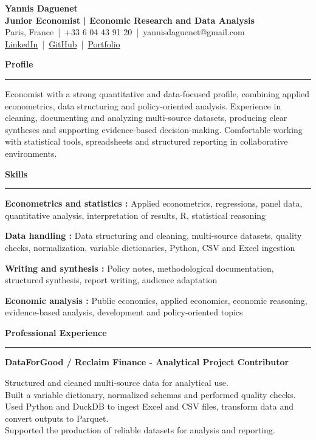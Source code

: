 \documentclass[11pt,a4paper]{article}
\newcommand{\sectiontitle}[1]{\vspace{0.26cm}\textbf{\large #1}\vspace{0.10cm}\hrule\vspace{0.13cm}}
\begin{document}
\begin{center}
{\Large \textbf{Yannis Daguenet} }\\
\textbf{Junior Economist | Economic Research and Data Analysis}\\
Paris, France \,|\, +33 6 04 43 91 20 \,|\, yannisdaguenet@gmail.com \\
\href{https://linkedin.com/in/yannis-daguenet}{LinkedIn} \,|\, \href{https://github.com/DaguenetYannis}{GitHub} \,|\, \href{https://daguenetyannisportfolio.netlify.app/}{Portfolio}\end{center}

\sectiontitle{Profile}

Economist with a strong quantitative and data-focused profile, combining applied econometrics, data structuring and policy-oriented analysis. Experience in cleaning, documenting and analyzing multi-source datasets, producing clear syntheses and supporting evidence-based decision-making. Comfortable working with statistical tools, spreadsheets and structured reporting in collaborative environments.

\sectiontitle{Skills}

\textbf{Econometrics and statistics :} Applied econometrics, regressions, panel data, quantitative analysis, interpretation of results, R, statistical reasoning

\vspace{0.08cm}
\textbf{Data handling :} Data structuring and cleaning, multi-source datasets, quality checks, normalization, variable dictionaries, Python, CSV and Excel ingestion

\vspace{0.08cm}
\textbf{Writing and synthesis :} Policy notes, methodological documentation, structured synthesis, report writing, audience adaptation

\vspace{0.08cm}
\textbf{Economic analysis :} Public economics, applied economics, economic reasoning, evidence-based analysis, development and policy-oriented topics


\sectiontitle{Professional Experience}

\textbf{DataForGood / Reclaim Finance - Analytical Project Contributor} \hfill  \hfill 

Structured and cleaned multi-source data for analytical use.\\
Built a variable dictionary, normalized schemas and performed quality checks.\\
Used Python and DuckDB to ingest Excel and CSV files, transform data and convert outputs to Parquet.\\
Supported the production of reliable datasets for analysis and reporting.\\
\end{document}
